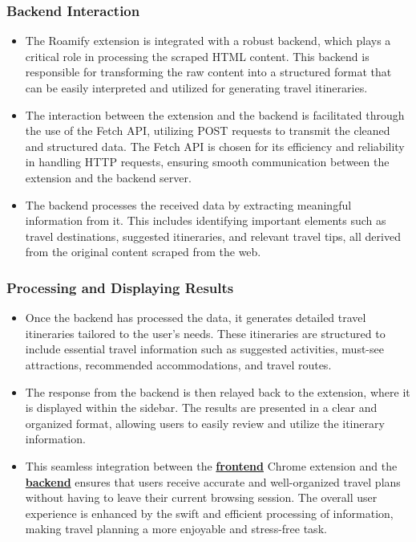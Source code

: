 \documentclass[conference]{IEEEtran}
\begin{document}
    \subsubsection{Backend Interaction}
        \begin{itemize}
            \item The Roamify extension is integrated with a robust backend, which plays a critical role in processing the scraped HTML content. This backend is responsible for transforming the raw content into a structured format that can be easily interpreted and utilized for generating travel itineraries.
            \item The interaction between the extension and the backend is facilitated through the use of the Fetch API, utilizing POST requests to transmit the cleaned and structured data. The Fetch API is chosen for its efficiency and reliability in handling HTTP requests, ensuring smooth communication between the extension and the backend server.
            \item The backend processes the received data by extracting meaningful information from it. This includes identifying important elements such as travel destinations, suggested itineraries, and relevant travel tips, all derived from the original content scraped from the web.
        \end{itemize}

    \subsubsection{Processing and Displaying Results}
        \begin{itemize}
            \item Once the backend has processed the data, it generates detailed travel itineraries tailored to the user’s needs. These itineraries are structured to include essential travel information such as suggested activities, must-see attractions, recommended accommodations, and travel routes.
            \item The response from the backend is then relayed back to the extension, where it is displayed within the sidebar. The results are presented in a clear and organized format, allowing users to easily review and utilize the itinerary information.
            \item This seamless integration between the \href{https://github.com/Roamify-Research/Extension/tree/main/src}{\textbf{frontend}} Chrome extension and the \href{https://github.com/Roamify-Research/Extension/tree/main/backend}{\textbf{backend}} ensures that users receive accurate and well-organized travel plans without having to leave their current browsing session. The overall user experience is enhanced by the swift and efficient processing of information, making travel planning a more enjoyable and stress-free task.
        \end{itemize}
\end{document}
